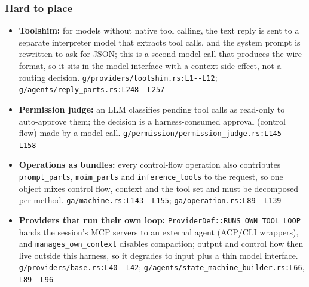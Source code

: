 \subsubsection*{Hard to place}
\begin{itemize}
\item \textbf{Toolshim:} for models without native tool calling, the text reply is sent to a separate interpreter model that extracts tool calls, and the system prompt is rewritten to ask for JSON; this is a second model call that produces the wire format, so it sits in the model interface with a context side effect, not a routing decision. \texttt{g/\allowbreak{}providers/\allowbreak{}toolshim.\allowbreak{}rs:\allowbreak{}L1-\allowbreak{}-\allowbreak{}L12}; \texttt{g/\allowbreak{}agents/\allowbreak{}reply\_\allowbreak{}parts.\allowbreak{}rs:\allowbreak{}L248-\allowbreak{}-\allowbreak{}L257}
\item \textbf{Permission judge:} an LLM classifies pending tool calls as read-only to auto-approve them; the decision is a harness-consumed approval (control flow) made by a model call. \texttt{g/\allowbreak{}permission/\allowbreak{}permission\_\allowbreak{}judge.\allowbreak{}rs:\allowbreak{}L145-\allowbreak{}-\allowbreak{}L158}
\item \textbf{Operations as bundles:} every control-flow operation also contributes \texttt{prompt\_\allowbreak{}parts}, \texttt{moim\_\allowbreak{}parts} and \texttt{inference\_\allowbreak{}tools} to the request, so one object mixes control flow, context and the tool set and must be decomposed per method. \texttt{ga/\allowbreak{}machine.\allowbreak{}rs:\allowbreak{}L143-\allowbreak{}-\allowbreak{}L155}; \texttt{ga/\allowbreak{}operation.\allowbreak{}rs:\allowbreak{}L89-\allowbreak{}-\allowbreak{}L139}
\item \textbf{Providers that run their own loop:} \texttt{ProviderDef:\allowbreak{}:\allowbreak{}RUNS\_\allowbreak{}OWN\_\allowbreak{}TOOL\_\allowbreak{}LOOP} hands the session's MCP servers to an external agent (ACP/CLI wrappers), and \texttt{manages\_\allowbreak{}own\_\allowbreak{}context} disables compaction; output and control flow then live outside this harness, so it degrades to input plus a thin model interface. \texttt{g/\allowbreak{}providers/\allowbreak{}base.\allowbreak{}rs:\allowbreak{}L40-\allowbreak{}-\allowbreak{}L42}; \texttt{g/\allowbreak{}agents/\allowbreak{}state\_\allowbreak{}machine\_\allowbreak{}builder.\allowbreak{}rs:\allowbreak{}L66}, \texttt{L89-\allowbreak{}-\allowbreak{}L96}
\end{itemize}

